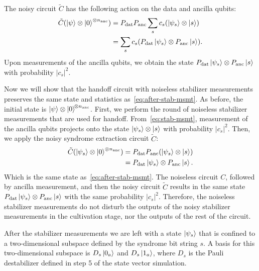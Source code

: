 \documentclass[%
    aps, 
    physrev,
    reprint,
]{revtex4-2}
\newcommand{\dat}{_\mathrm{dat}}
\newcommand{\anc}{_\mathrm{anc}}
\begin{document}
The noisy circuit $\tilde{C}$ has the following action on the data and ancilla qubits:
\begin{equation}\label{eq:after-stab-msmt} 
    \begin{aligned}
        \tilde{C} (\ket{\psi} \otimes \ket{0}^{\otimes n\anc}) 
        &= P\dat P\anc \sum_s c_s (\ket{\psi_s} \otimes \ket{s}) \\
        &= \sum_s c_s (P\dat \ket{\psi_s} \otimes P\anc \ket{s})
        .
    \end{aligned}
\end{equation}
Upon measurements of the ancilla qubits, we obtain the state $P\dat\ket{\psi_s} \otimes P\anc\ket{s}$ with probability $|c_s|^2$.

Now we will show
that the handoff circuit with noiseless stabilizer measurements preserves the same state and statistics as~\cref{eq:after-stab-msmt}.
As before, the initial state is $\ket{\psi} \otimes \ket{0}^{\!\otimes n\anc}$. 
First, we perform the round of noiseless stabilizer measurements that are used for handoff.
From~\cref{eq:stab-msmt}, measurement of the ancilla qubits projects onto the state $\ket{\psi_s} \otimes \ket{s}$ with probability $|c_s|^2$.
Then, we apply the noisy syndrome extraction circuit $\tilde{C}$:
\begin{equation}
    \begin{aligned}
        \tilde{C} (\ket{\psi_s} \otimes \ket{0}^{\otimes n\anc}) 
        &= P\dat P\anc (\ket{\psi_s} \otimes \ket{s}) \\
        &= P\dat \ket{\psi_s} \otimes P\anc \ket{s}.
        \label{eq:handoff-after-stabmsmt}
    \end{aligned}
\end{equation}
Which is the same state as~\cref{eq:after-stab-msmt}.
The noiseless circuit $C$, followed by ancilla measurement, and then the noisy circuit $\tilde{C}$ results in the same state $P\dat\ket{\psi_s} \otimes P\anc\ket{s}$ with the same probability $|c_s|^2$.
Therefore, the noiseless stabilizer measurements do not disturb the outputs of the noisy stabilizer measurements in the cultivation stage, nor the outputs of the rest of the circuit. 

After the stabilizer measurements we are left with a state $\ket{\psi_s}$ that
is confined to a two-dimensional subspace defined by the syndrome bit string $s$.
A basis for this two-dimensional subspace is $D_s\ket{0_a}$ and $D_s\ket{1_a}$, where $D_s$ is the Pauli destabilizer defined in step 5 of the state vector simulation. 
\end{document}
